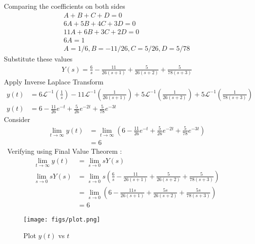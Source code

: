 \documentclass[journal,12pt,onecolumn]{IEEEtran}
\theoremstyle{remark}
\renewcommand{\brak}[1]{\left(#1\right)}
\begin{document}
Comparing the coefficients on both sides \\
\begin{align}
A + B + C + D = 0 \\
6A + 5B + 4C + 3D = 0 \\
11A + 6B + 3C + 2D = 0 \\
6A = 1 \\
A=1/6 ,B = -11/26 , C= 5/26 , D= 5/78 
\end{align}
Substitute these values 
\begin{align}
Y(s) = \frac{6}{s} - \frac{11}{26\brak{s+1}} + \frac{5}{26\brak{s+2}} + \frac{5}{78\brak{s+3}}
\end{align}
Apply Inverse Laplace Transform 
\begin{align}
y(t) &= 6\mathcal{L}^{-1}\brak{\frac{1}{s}} - 11\mathcal{L}^{-1}\brak{\frac{1}{26\brak{s+1}}} + 5\mathcal{L}^{-1}\brak{\frac{1}{26\brak{s+2}}} + 5\mathcal{L}^{-1}\brak{\frac{1}{78\brak{s+3}}} \\
y(t) &= 6 - \frac{11}{26}e^{-t} + \frac{5}{26}e^{-2t} +\frac{5}{78}e^{-3t}
\end{align}
Consider
\begin{align}
\lim_{t \to \infty} y(t) &= \lim_{t \to \infty} \brak{6 - \frac{11}{26}e^{-t} + \frac{5}{26}e^{-2t} +\frac{5}{78}e^{-3t}} \\
&= 6
\end{align}\
Verifying using Final Value Theorem :\\
\begin{align}
 \lim_{t \to \infty} y(t)   &= \lim_{s \to 0} sY(s)  \\
\lim_{s \to 0} sY(s) &= \lim_{s \to 0} s \brak{ \frac{6}{s} - \frac{11}{26\brak{s+1}} + \frac{5}{26\brak{s+2}} + \frac{5}{78\brak{s+3}}} \\
&= \lim_{s \to 0} \brak{ 6 - \frac{11s}{26\brak{s+1}} + \frac{5s}{26\brak{s+2}} + \frac{5s}{78\brak{s+3}}} \\
&= 6
\end{align}

\begin{figure}[h!]
\centering
\texttt{[image: figs/plot.png]}
\caption{Plot $y(t)$ vs $t$ }
\end{figure}
\end{document}
